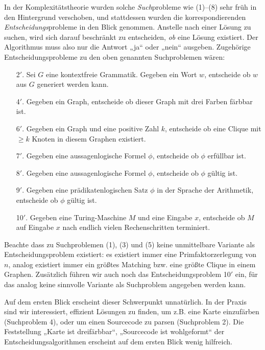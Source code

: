 In der Komplexitätstheorie wurden solche \emph{Such}probleme wie (1)--(8) sehr früh in den Hintergrund verschoben, und stattdessen wurden die korrespondierenden \emph{Entscheidungs}probleme in den Blick genommen. 
Anstelle nach einer Lösung zu suchen, wird sich darauf beschränkt zu entscheiden, \emph{ob} eine Lösung existiert. Der Algorithmus muss also nur die Antwort „ja“ oder „nein“ ausgeben. Zugehörige Entscheidungsprobleme zu den oben genannten Suchproblemen wären:
\begin{enumerate}[beginpenalty=0,midpenalty=0]
    \item[2$'$.] Sei $G$ eine kontextfreie Grammatik. Gegeben ein Wort $w$, entscheide ob $w$ aus $G$ generiert werden kann.
    \item[4$'$.] Gegeben ein Graph, entscheide ob dieser Graph mit drei Farben färbbar ist.
    \item[6$'$.] Gegeben ein Graph und eine positive Zahl $k$, entscheide ob eine Clique mit $\geq k$ Knoten in diesem Graphen existiert.
    \item[7$'$.] Gegeben eine aussagenlogische Formel $\phi$, entscheide ob $\phi$ erfüllbar ist.
    \item[8$'$.] Gegeben eine aussagenlogische Formel $\phi$, entscheide ob $\phi$ gültig ist.
    \item[9$'$.] Gegeben eine prädikatenlogischen Satz $\phi$ in der Sprache der Arithmetik, entscheide ob $\phi$ gültig ist.
    \item[10$'$.] Gegeben eine Turing-Maschine $M$ und eine Eingabe $x$, entscheide ob $M$ auf Eingabe $x$ nach endlich vielen Rechenschritten terminiert.
\end{enumerate}
Beachte dass zu Suchproblemen (1), (3) und (5) keine unmittelbare Variante als Entscheidungsproblem existiert: es existiert immer eine Primfaktorzerlegung von $n$, analog existiert immer ein größtes Matching bzw. eine größte Clique in einem Graphen.
Zusätzlich führen wir auch noch das Entscheidungsproblem 10$'$ ein, für das analog keine sinnvolle Variante als Suchproblem angegeben werden kann.

Auf dem ersten Blick erscheint dieser Schwerpunkt unnatürlich. In der Praxis sind wir interessiert, effizient Lösungen zu finden, um z.B. eine Karte einzufärben (Suchproblem 4), oder um einen Sourcecode zu parsen (Suchproblem 2). Die Feststellung „Karte ist dreifärbbar“, „Sourcecode ist wohlgeformt“ der Entscheidungsalgorithmen erscheint auf dem ersten Blick wenig hilfreich.

